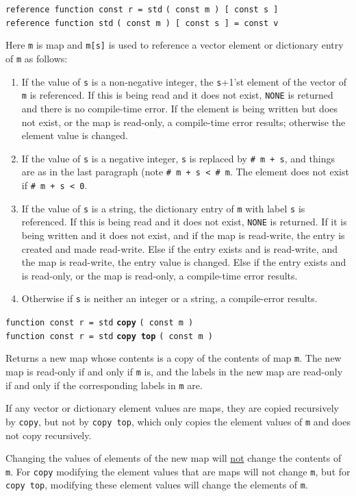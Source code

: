 \documentclass[12pt]{article}
\newcommand{\ttkey}[1]{{\tt \bfseries #1}}
\newenvironment{indpar}[1][0.3in]%
	{\begin{list}{}%
		     {\setlength{\itemsep}{0in}%
		      \setlength{\topsep}{0in}%
		      \setlength{\parsep}{1ex}%
		      \setlength{\labelwidth}{#1}%
		      \setlength{\leftmargin}{#1}%
		      \addtolength{\leftmargin}{\labelsep}}%
	 \item}%
	{\end{list}}
\begin{document}
{\tt reference function const r = std} {\tt ( const m ) [ const s ]} \\
{\tt reference function std} {\tt ( const m ) [ const s ] = const v}
\begin{indpar}
Here {\tt m} is map and {\tt m[s]} is used to reference a
vector element or dictionary entry of {\tt m} as follows:
\begin{enumerate}
\item If the value of {\tt s} is a non-negative integer,
the {\tt s}+1'st element
of the vector of {\tt m} is referenced.  If this is being read and
it does not exist, {\tt NONE} is returned and there is no compile-time
error.
If the element is being written but does not exist, or the map
is read-only, a compile-time error results; otherwise the element
value is changed.
\item If the value of {\tt s} is a negative integer,
{\tt s} is replaced by {\tt \# m + s}, and things
are as in the last paragraph (note {\tt \# m + s < \# m}.  The element
does not exist if {\tt \# m + s < 0}.
\item If the value of {\tt s} is a string, the dictionary entry
of {\tt m} with label {\tt s} is referenced.  If this is being read and
it does not exist, {\tt NONE} is returned.  If it is being written and
it does not exist, and if the map is read-write,
the entry is created and made read-write.
Else if the entry exists and is read-write, and the map is read-write,
the entry value is changed.
Else if the entry exists and is read-only, or the map is read-only,
a compile-time error results.
\item Otherwise if {\tt s} is neither an integer or a string,
a compile-error results.
\end{enumerate}
\end{indpar}

{\tt function const r = std} \ttkey{copy} {\tt ( const m )} \\
{\tt function const r = std} \ttkey{copy top} {\tt ( const m )} %
\label{MAP-COPY}
\begin{indpar}
Returns a new map whose contents is a copy of the contents of
map {\tt m}.  The new map is read-only if and only if {\tt m} is,
and the labels in the new map are read-only if and only if the
corresponding labels in {\tt m} are.

If any vector or dictionary element values are maps, they are
copied recursively by {\tt copy}, but not by
{\tt copy top}, which only copies the element values of {\tt m}
and does not copy recursively.

Changing the values of elements of the new map will \underline{not} change
the contents of {\tt m}.  For {\tt copy} modifying the element values
that are maps will not change {\tt m}, but for {\tt copy top},
modifying these element values will change the elements of {\tt m}.

\end{indpar}
\end{document}
